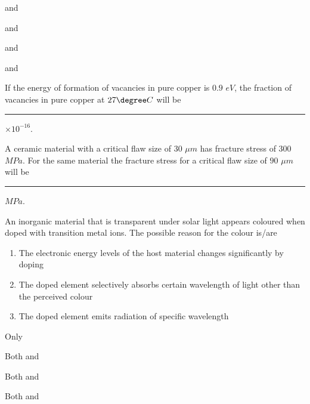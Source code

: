 \hfill{}
\begin{enumerate}
\begin{multicols}{4}
    \item {} and 
    \item {} and 
    \item {} and 
    \item {} and 
\end{multicols}
\end{enumerate}


\item If the energy of formation of vacancies in pure copper is $0.9$ $eV$, the fraction of vacancies in pure copper at $27{{\degree}} C$ will be \rule{2.5cm}{0.4pt}$\times 10^{-16}$. 

\hfill{}

\item A ceramic material with a critical flaw size of $30$ $\mu m$ has fracture stress of $300$ $MPa$. For the same material the fracture stress for a critical flaw size of $90$ $\mu m$ will be \rule{2.5cm}{0.4pt}$MPa$.

\hfill{}

\item An inorganic material that is transparent under solar light appears coloured when doped with transition metal ions. The possible reason for the colour is/are	

\begin{enumerate}[label=(\roman*)]
    \item The electronic energy levels of the host material changes significantly by doping
    \item The doped element selectively absorbs certain wavelength of light other than the perceived colour
    \item The doped element emits radiation of specific wavelength
\end{enumerate}

\hfill{}
\begin{enumerate}
\begin{multicols}{4}
    \item Only 
    \item Both  and 
    \item Both  and 
    \item Both  and 
\end{multicols}
\end{enumerate}

